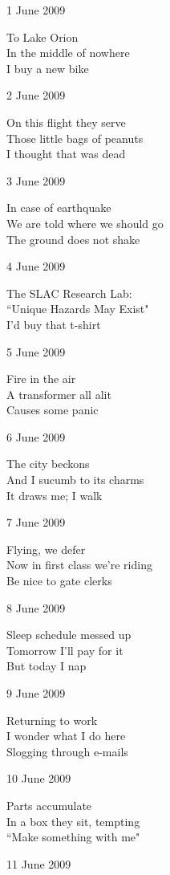 \documentclass[12pt]{article}
\begin{document}
1 June 2009

To Lake Orion \\
In the middle of nowhere \\
I buy a new bike

2 June 2009

On this flight they serve \\
Those little bags of peanuts \\
I thought that was dead

\newpage


3 June 2009

In case of earthquake \\
We are told where we should go \\
The ground does not shake

4 June 2009

The SLAC Research Lab: \\
``Unique Hazards May Exist" \\
I'd buy that t-shirt

5 June 2009

Fire in the air \\
A transformer all alit \\
Causes some panic

6 June 2009

The city beckons \\
And I sucumb to its charms \\
It draws me; I walk

7 June 2009

Flying, we defer \\
Now in first class we're riding \\
Be nice to gate clerks

8 June 2009

Sleep schedule messed up \\
Tomorrow I'll pay for it \\
But today I nap

9 June 2009

Returning to work \\
I wonder what I do here \\
Slogging through e-mails


\newpage

10 June 2009

Parts accumulate \\
In a box they sit, tempting \\
``Make something with me"

11 June 2009
\end{document}
